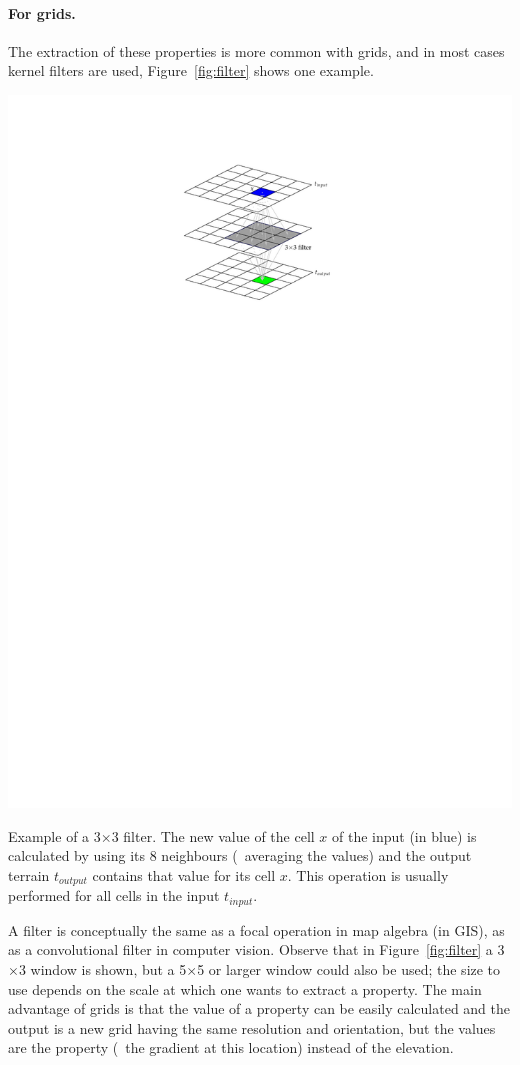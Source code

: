 \paragraph{For grids.}
The extraction of these properties is more common with grids, and in most cases kernel filters are used, Figure~\ref{fig:filter} shows one example.
\begin{marginfigure}
  \centering
  \includegraphics[width=\linewidth]{figs/filter}
  \caption{Example of a 3$\times$3 filter. The new value of the cell $x$ of the input (in blue) is calculated by using its 8 neighbours (\eg\ averaging the values) and the output terrain $t_{output}$ contains that value for its cell $x$. This operation is usually performed for all cells in the input $t_{input}$.}%
\label{fig:filter}
\end{marginfigure}%
A filter is conceptually the same as a focal operation in map algebra (in GIS), as as a convolutional filter in computer vision.
Observe that in Figure~\ref{fig:filter} a 3$\times$3 window is shown, but a 5$\times$5%
or larger window could also be used; the size to use depends on the scale at which one wants to extract a property.
The main advantage of grids is that the value of a property can be easily calculated and the output is a new grid having the same resolution and orientation, but the values are the property (\eg\ the gradient at this location) instead of the elevation.

